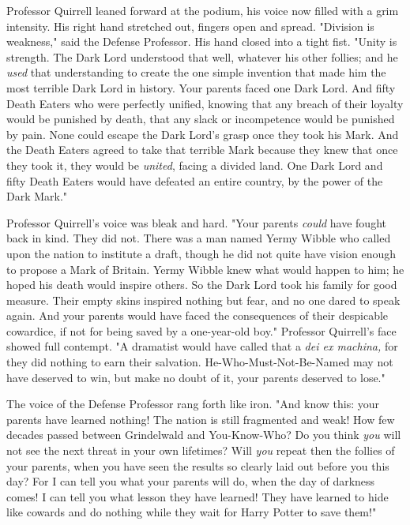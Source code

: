 Professor Quirrell leaned forward at the podium, his voice now filled with a 
grim intensity. His right hand stretched out, fingers open and spread. 
"Division is weakness," said the Defense Professor. His hand closed into a 
tight fist. "Unity is strength. The Dark Lord understood that well, whatever 
his other follies; and he \emph{used} that understanding to create the one 
simple invention that made him the most terrible Dark Lord in history. Your 
parents faced one Dark Lord. And fifty Death Eaters who were perfectly unified, 
knowing that any breach of their loyalty would be punished by death, that any 
slack or incompetence would be punished by pain. None could escape the Dark 
Lord's grasp once they took his Mark. And the Death Eaters agreed to take that 
terrible Mark because they knew that once they took it, they would be 
\emph{united}, facing a divided land. One Dark Lord and fifty Death Eaters 
would have defeated an entire country, by the power of the Dark Mark."

Professor Quirrell's voice was bleak and hard. "Your parents \emph{could} have 
fought back in kind. They did not. There was a man named Yermy Wibble who 
called upon the nation to institute a draft, though he did not quite have 
vision enough to propose a Mark of Britain. Yermy Wibble knew what would happen 
to him; he hoped his death would inspire others. So the Dark Lord took his 
family for good measure. Their empty skins inspired nothing but fear, and no 
one dared to speak again. And your parents would have faced the consequences of 
their despicable cowardice, if not for being saved by a one-year-old boy." 
Professor Quirrell's face showed full contempt. "A dramatist would have called 
that a \emph{dei ex machina,} for they did nothing to earn their salvation. 
He-Who-Must-Not-Be-Named may not have deserved to win, but make no doubt of it, 
your parents deserved to lose."

The voice of the Defense Professor rang forth like iron. "And know this: your 
parents have learned nothing! The nation is still fragmented and weak! How few 
decades passed between Grindelwald and You-Know-Who? Do you think \emph{you} 
will not see the next threat in your own lifetimes? Will \emph{you} repeat then 
the follies of your parents, when you have seen the results so clearly laid out 
before you this day? For I can tell you what your parents will do, when the day 
of darkness comes! I can tell you what lesson they have learned! They have 
learned to hide like cowards and do nothing while they wait for Harry Potter to 
save them!"


